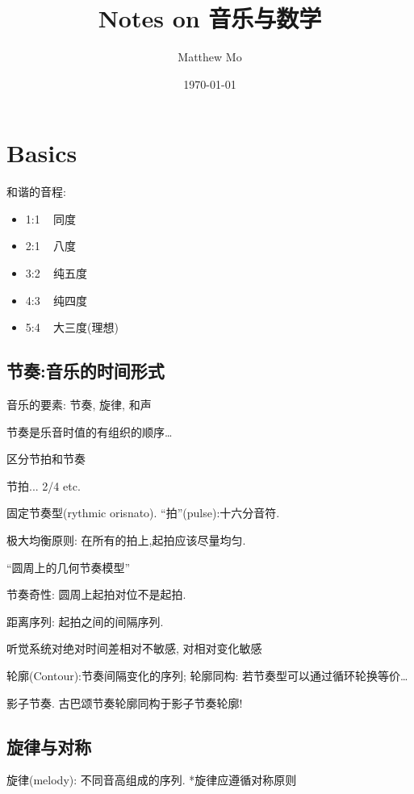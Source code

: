 \documentclass{article}
\title{\textbf{Notes on 音乐与数学}}
\author{Matthew Mo}
\date{\today}
\begin{document}
\maketitle
\section*{ }
\label{contents}
\tableofcontents

\section{Basics}

    和谐的音程: \begin{itemize}
        \item 1:1 ~ 同度
        \item 2:1 ~ 八度
        \item 3:2 ~ 纯五度
        \item 4:3 ~ 纯四度
        \item 5:4 ~ 大三度(理想)
    \end{itemize}

\subsection{节奏:音乐的时间形式}
    音乐的要素: 节奏, 旋律, 和声
    
     节奏是乐音时值的有组织的顺序\dots

     区分节拍和节奏
    
     节拍... 2/4 etc.

     固定节奏型(rythmic orisnato). ``拍''(pulse):十六分音符.

     极大均衡原则: 在所有的拍上,起拍应该尽量均匀.

     ``圆周上的几何节奏模型''

     节奏奇性: 圆周上起拍对位不是起拍.

     距离序列: 起拍之间的间隔序列.

    听觉系统对绝对时间差相对不敏感, 对相对变化敏感 \trarr

     轮廓(Contour):节奏间隔变化的序列; 轮廓同构: 若节奏型可以通过循环轮换等价\dots 

     影子节奏. 古巴颂节奏轮廓同构于影子节奏轮廓!
\subsection{旋律与对称}
     旋律(melody): 不同音高组成的序列. *旋律应遵循对称原则
 
\end{document}
